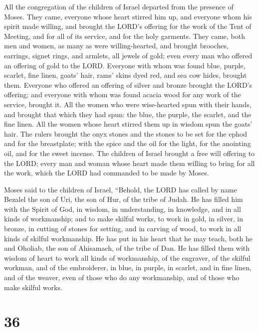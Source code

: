  All the congregation of the children of Israel departed
from the presence of Moses.  They came, everyone whose
heart stirred him up, and everyone whom his spirit made willing, and
brought the LORD's offering for the work of the Tent of Meeting, and for
all of its service, and for the holy garments.  They came,
both men and women, as many as were willing-hearted, and brought
brooches, earrings, signet rings, and armlets, all jewels of gold; even
every man who offered an offering of gold to the LORD. 
Everyone with whom was found blue, purple, scarlet, fine linen, goats'
hair, rams' skins dyed red, and sea cow hides, brought them.
 Everyone who offered an offering of silver and bronze
brought the LORD's offering; and everyone with whom was found acacia
wood for any work of the service, brought it.  All the
women who were wise-hearted spun with their hands, and brought that
which they had spun: the blue, the purple, the scarlet, and the fine
linen.  All the women whose heart stirred them up in wisdom
spun the goats' hair.  The rulers brought the onyx stones
and the stones to be set for the ephod and for the breastplate;
 with the spice and the oil for the light, for the
anointing oil, and for the sweet incense.  The children of
Israel brought a free will offering to the LORD; every man and woman
whose heart made them willing to bring for all the work, which the LORD
had commanded to be made by Moses.

 Moses said to the children of Israel, ``Behold, the LORD
has called by name Bezalel the son of Uri, the son of Hur, of the tribe
of Judah.  He has filled him with the Spirit of God, in
wisdom, in understanding, in knowledge, and in all kinds of workmanship;
 and to make skilful works, to work in gold, in silver, in
bronze,  in cutting of stones for setting, and in carving
of wood, to work in all kinds of skilful workmanship.  He
has put in his heart that he may teach, both he and Oholiab, the son of
Ahisamach, of the tribe of Dan.  He has filled them with
wisdom of heart to work all kinds of workmanship, of the engraver, of
the skilful workman, and of the embroiderer, in blue, in purple, in
scarlet, and in fine linen, and of the weaver, even of those who do any
workmanship, and of those who make skilful works.

\hypertarget{section-35}{%
\section{36}\label{section-35}}

